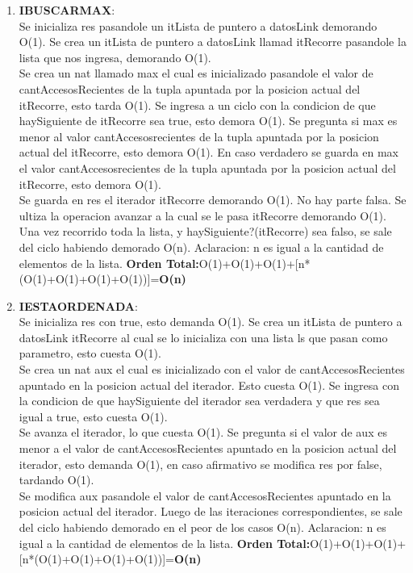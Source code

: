 \documentclass[10pt, a4paper]{article}
\begin{document}
\begin{enumerate}
\item \textbf{IBUSCARMAX}:\\ Se inicializa res pasandole un itLista de puntero a datosLink demorando O(1). Se crea un itLista de puntero a datosLink llamad itRecorre pasandole la lista que nos ingresa, demorando O(1). \\
Se crea un nat llamado max el cual es inicializado pasandole el valor de cantAccesosRecientes de la tupla apuntada por la posicion actual del itRecorre, esto tarda O(1). Se ingresa a un ciclo con la condicion de que haySiguiente de itRecorre sea true, esto demora O(1). 
Se pregunta si max es menor al valor cantAccesosrecientes de la tupla apuntada por la posicion actual del itRecorre, esto demora O(1). En caso verdadero se guarda en max el valor cantAccesosrecientes de la tupla apuntada por la posicion actual del itRecorre, esto demora O(1).\\
Se guarda en res el iterador itRecorre demorando O(1). No hay parte falsa. Se ultiza la operacion avanzar a la cual se le pasa itRecorre demorando O(1). Una vez recorrido toda la lista, y haySiguiente?(itRecorre) sea falso, se sale del ciclo habiendo demorado O(n).
Aclaracion: n es igual a la cantidad de elementos de la lista.
\textbf{Orden Total:}O(1)+O(1)+O(1)+[n*(O(1)+O(1)+O(1)+O(1))]=\textbf{O(n)}

     \item \textbf{IESTAORDENADA}:\\ Se inicializa res con true, esto demanda O(1). Se crea un itLista de puntero a datosLink itRecorre al cual se lo inicializa con una lista ls que pasan como parametro, esto cuesta O(1). \\
Se crea un nat aux el cual es inicializado con el valor de cantAccesosRecientes apuntado en la posicion actual del iterador. Esto cuesta O(1). Se ingresa con la condicion de que haySiguiente del iterador sea verdadera y que res sea igual a true, esto cuesta O(1). \\
Se avanza el iterador, lo que cuesta O(1). Se pregunta si el valor de aux es menor a el valor de cantAccesosRecientes apuntado en la posicion actual del iterador, esto demanda O(1), en caso afirmativo se modifica res por false, tardando O(1). \\
Se modifica aux pasandole el valor de cantAccesosRecientes apuntado en la posicion actual del iterador. Luego de las iteraciones correspondientes, se sale del ciclo habiendo demorado en el peor de los casos O(n). 
Aclaracion: n es igual a la cantidad de elementos de la lista.
\textbf{Orden Total:}O(1)+O(1)+O(1)+[n*(O(1)+O(1)+O(1)+O(1))]=\textbf{O(n)}


\end{enumerate}
\end{document}
